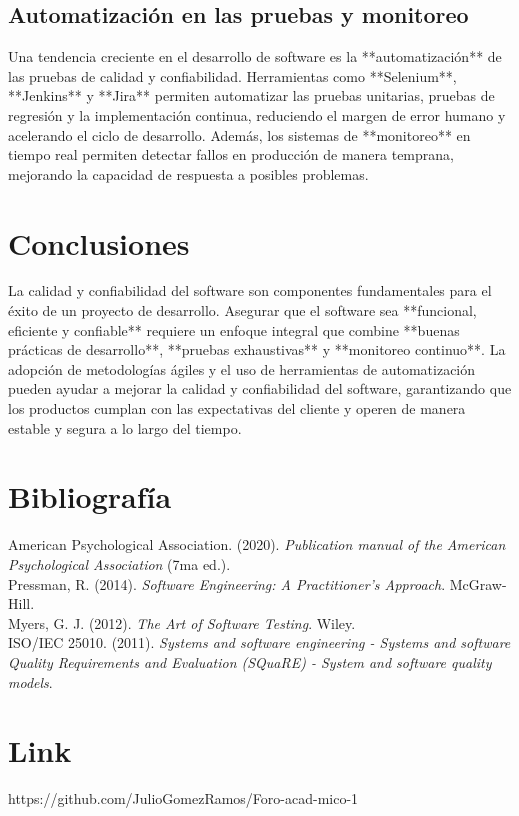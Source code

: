 \documentclass[12pt]{article}
\begin{document}
\subsection{Automatización en las pruebas y monitoreo}
Una tendencia creciente en el desarrollo de software es la **automatización** de las pruebas de calidad y confiabilidad. Herramientas como **Selenium**, **Jenkins** y **Jira** permiten automatizar las pruebas unitarias, pruebas de regresión y la implementación continua, reduciendo el margen de error humano y acelerando el ciclo de desarrollo. Además, los sistemas de **monitoreo** en tiempo real permiten detectar fallos en producción de manera temprana, mejorando la capacidad de respuesta a posibles problemas.

\section{Conclusiones}
La calidad y confiabilidad del software son componentes fundamentales para el éxito de un proyecto de desarrollo. Asegurar que el software sea **funcional, eficiente y confiable** requiere un enfoque integral que combine **buenas prácticas de desarrollo**, **pruebas exhaustivas** y **monitoreo continuo**. La adopción de metodologías ágiles y el uso de herramientas de automatización pueden ayudar a mejorar la calidad y confiabilidad del software, garantizando que los productos cumplan con las expectativas del cliente y operen de manera estable y segura a lo largo del tiempo.

\section*{Bibliografía}
American Psychological Association. (2020). \textit{Publication manual of the American Psychological Association} (7ma ed.).\\
Pressman, R. (2014). \textit{Software Engineering: A Practitioner's Approach}. McGraw-Hill.\\
Myers, G. J. (2012). \textit{The Art of Software Testing}. Wiley.\\
ISO/IEC 25010. (2011). \textit{Systems and software engineering - Systems and software Quality Requirements and Evaluation (SQuaRE) - System and software quality models}.\\

\section*{Link} 
https://github.com/JulioGomezRamos/Foro-acad-mico-1
\end{document}
